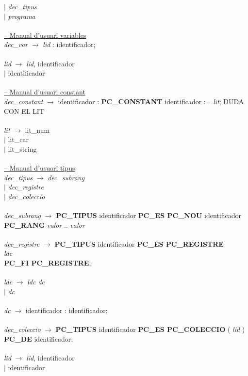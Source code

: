 \documentclass[10pt]{report}
\begin{document}
\begin{tabbing}
        \> $\mid$ \> \textit{dec\_tipus} \\
        \> $\mid$ \> \textit{programa} \\
        \\
        \underline{-- Manual d'usuari variables} \\
        \textit{dec\_var} \> $\rightarrow$ \> \textit{lid} : identificador; \\
        \\
        \textit{lid} \> $\rightarrow$ \> \textit{lid}, identificador \\
        \> $\mid$ \> identificador \\
        \\
        \underline{-- Manual d'usuari constant} \\
        \textit{dec\_constant} \> $\rightarrow$ \> identificador : \textbf{PC\_CONSTANT} identificador := \textit{lit};  DUDA CON EL LIT\\
        \\
        \textit{lit} \> $\rightarrow$ \> lit\_num \\
        \> $\mid$ \> lit\_car \\
        \> $\mid$ \> lit\_string \\
        \\
        \underline{-- Manual d'usuari tipus} \\
        \textit{dec\_tipus} \> $\rightarrow$ \> \textit{dec\_subrang}  \\
        \> $\mid$ \> \textit{dec\_registre} \\
        \> $\mid$ \> \textit{dec\_coleccio} \\
        \\
        \textit{dec\_subrang} \> $\rightarrow$ \> \textbf{PC\_TIPUS} identificador \textbf{PC\_ES PC\_NOU} identificador \textbf{PC\_RANG} \textit{valor} .. \textit{valor} \\
        \\
        \textit{dec\_registre} \> $\rightarrow$ \> \textbf{PC\_TIPUS} identificador \textbf{PC\_ES PC\_REGISTRE} \\
        \> \> \> \textit{ldc} \\
        \> \> \textbf{PC\_FI PC\_REGISTRE}; \\
        \\
        \textit{ldc} \> $\rightarrow$ \> \textit{ldc dc} \\
        \> $\mid$ \> \textit{dc} \\
        \\
        \textit{dc} \> $\rightarrow$ \> identificador : identificador; \\
        \\
        \textit{dec\_coleccio} \> $\rightarrow$ \> \textbf{PC\_TIPUS} identificador \textbf{PC\_ES PC\_COLECCIO} ( \textit{lid} ) \textbf{PC\_DE} identificador; \\
        \\
        \textit{lid} \> $\rightarrow$ \> \textit{lid}, identificador \\
        \> $\mid$ \> identificador \\
        \\
        

\end{tabbing}
\end{document}
